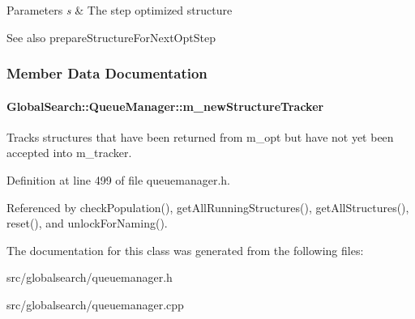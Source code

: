 \begin{DoxyParams}{Parameters}
{\em s} & The step optimized structure \\
\hline
\end{DoxyParams}
\begin{DoxySeeAlso}{See also}
prepare\+Structure\+For\+Next\+Opt\+Step 
\end{DoxySeeAlso}


\subsubsection{Member Data Documentation}
\hypertarget{classGlobalSearch_1_1QueueManager_ab93522c4a198ea3401baf662b00a7ec7}{}
\paragraph[{m\+\_\+new\+Structure\+Tracker}]{ Global\+Search\+::\+Queue\+Manager\+::m\+\_\+new\+Structure\+Tracker\hspace{0.3cm}{\ttfamily [protected]}}\label{classGlobalSearch_1_1QueueManager_ab93522c4a198ea3401baf662b00a7ec7}
Tracks structures that have been returned from m\+\_\+opt but have not yet been accepted into m\+\_\+tracker. 

Definition at line 499 of file queuemanager.\+h.



Referenced by check\+Population(), get\+All\+Running\+Structures(), get\+All\+Structures(), reset(), and unlock\+For\+Naming().



The documentation for this class was generated from the following files\+:\begin{DoxyCompactItemize}
\item 
src/globalsearch/queuemanager.\+h\item 
src/globalsearch/queuemanager.\+cpp\end{DoxyCompactItemize}
